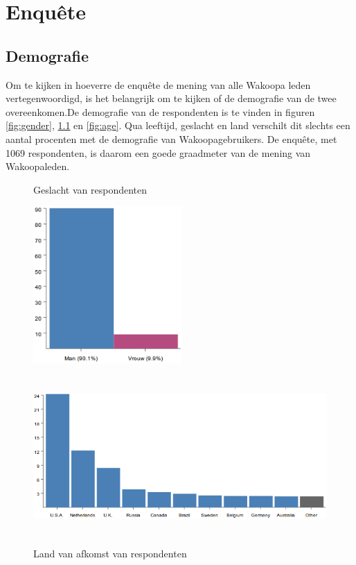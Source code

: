 \chapter{Enqu\^ete}
      \section{Demografie}
        Om te kijken in hoeverre de enqu\^ete de mening van alle Wakoopa leden vertegenwoordigd, is het belangrijk om te kijken of de demografie van de twee overeenkomen.De demografie van de respondenten is te vinden in figuren \ref{fig:gender}, \ref{fig:country} en \ref{fig:age}. Qua leeftijd, geslacht en land verschilt dit slechts een aantal procenten met de demografie van Wakoopagebruikers. De enqu\^ete, met 1069 respondenten, is daarom een goede graadmeter van de mening van Wakoopaleden.
        \begin{figure}
          \begin{center}
          \caption{Geslacht van respondenten}
            \includegraphics[height=60mm, angle=90]{../images/enquete/gender}
          \label{fig:gender}

          \caption{Land van afkomst van respondenten}
            \includegraphics[height=60mm, angle=90]{../images/enquete/country}
            \label{fig:country}

          \end{center}
        \end{figure}

